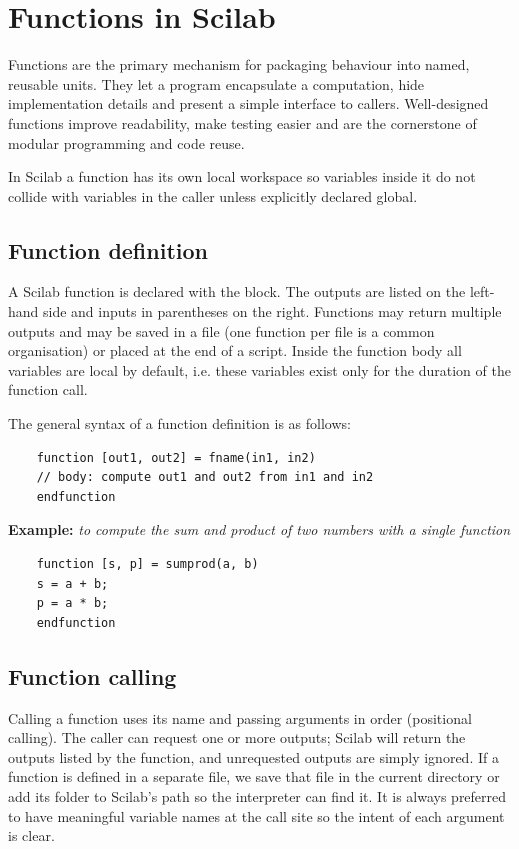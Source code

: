 \section{Functions in Scilab}
	Functions are the primary mechanism for packaging behaviour into named, reusable units. They let a program encapsulate a computation, hide implementation details and present a simple interface to callers. Well-designed functions improve readability, make testing easier and are the cornerstone of modular programming and code reuse. 
	
	In Scilab a function has its own local workspace so variables inside it do not collide with variables in the caller unless explicitly declared global.
	
	\subsection{Function definition} \label{ssec:func-defn}
		A Scilab function is declared with the  block. The outputs are listed on the left-hand side and inputs in parentheses on the right. Functions may return multiple outputs and may be saved in a  file (one function per file is a common organisation) or placed at the end of a script. Inside the function body all variables are local by default, i.e. these variables exist only for the duration of the function call.
		
		The general syntax of a function definition is as follows:
		\begin{verbatim}
	function [out1, out2] = fname(in1, in2)
	// body: compute out1 and out2 from in1 and in2
	endfunction
		\end{verbatim}
		
		\textbf{Example:} \textit{to compute the sum and product of two numbers with a single function}
		\begin{verbatim}
	function [s, p] = sumprod(a, b)
	s = a + b;
	p = a * b;
	endfunction
		\end{verbatim}
	
	\subsection{Function calling}
		Calling a function uses its name and passing arguments in order (positional calling). The caller can request one or more outputs; Scilab will return the outputs listed by the function, and unrequested outputs are simply ignored. If a function is defined in a separate  file, we save that file in the current directory or add its folder to Scilab's path so the interpreter can find it. It is always preferred to have meaningful variable names at the call site so the intent of each argument is clear.
		
